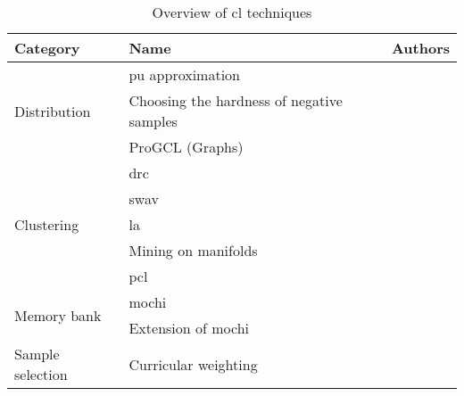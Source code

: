 \documentclass[runningheads]{llncs}
\begin{document}
\begin{table}[]
    \caption{Overview of \acs{cl} techniques}
    \label{tab:overview}
    \begin{tabular}{|l|l|l|}
    \hline
    \textbf{Category}                                   & \textbf{Name}                             & \textbf{Authors} \\ \hline
    \multirow{3}{*}{Distribution} & \acs{pu} approximation                          & \citet{chuang_debiased_2020}                \\ \cline{2-3} 
    \multicolumn{1}{|c|}{}                              & Choosing the hardness of negative samples     & \citet{robinson_contrastive_2021}                \\ \cline{2-3} 
    \multicolumn{1}{|c|}{}                              & ProGCL (Graphs)                               & \citet{progcl_2022}                \\ \hline
    \multirow{5}{*}{Clustering}                         & \acs{drc}                                       & \citet{DRC_2020}                \\ \cline{2-3} 
                                                        & \acs{swav}                                      & \citet{swav_2020}                \\ \cline{2-3} 
                                                        & \acs{la}                                       & \citet{local_aggr_2019}                \\ \cline{2-3} 
                                                        & Mining on manifolds                           & \citet{mining_manifolds_2018}                \\ \cline{2-3} 
                                                        & \ac{pcl}                                      & \citet{PCL_2021}               \\ \hline
    \multirow{2}{*}{Memory bank}                             & \acs{mochi}                                     & \citet{mochi_2020}                \\ \cline{2-3} 
                                                        & Extension of \acs{mochi}                        & \citet{progcl_2022}                \\ \hline
    Sample selection                                              & Curricular weighting                          & \citet{curricular_weighting_2024}               \\ \hline
    \end{tabular}
    \end{table}
\end{document}

